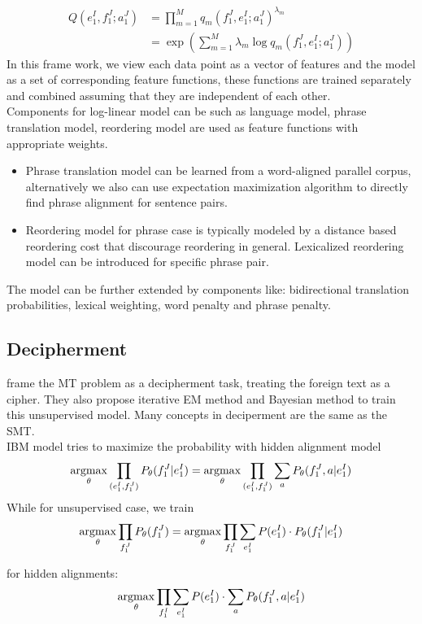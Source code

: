\begin{align*}
	Q(e_1^I, f_1^J; a_1^J) & = \prod_{m=1}^{M} q_m(f_1^J, e_1^I; a_1^J)^{\lambda_m} \\
	& = \exp(\sum_{m=1}^{M} \lambda_m \log q_m(f_1^J, e_1^I; a_1^J))
\end{align*}
In this frame work, we view each data point as a vector of features and the model as a set of corresponding feature functions, these functions are trained separately and combined assuming that they are independent of each other.\\ 

Components for log-linear model can be such as language model, phrase translation model, reordering model are used as feature functions with appropriate weights.
\begin{itemize}
	\item Phrase translation model can be learned from a word-aligned parallel corpus, alternatively we also can use expectation maximization algorithm to directly find phrase alignment for sentence pairs.
	\item Reordering model for phrase case is typically modeled by a distance based reordering cost that discourage reordering in general. Lexicalized reordering model can be introduced for specific phrase pair.
\end{itemize}

The model can be further extended by components like: bidirectional translation probabilities, lexical weighting, word penalty and phrase penalty. 

\subsection{Decipherment}
\cite{ravi2011deciphering} frame the MT problem as a decipherment task, treating the foreign text as a cipher. They also propose iterative EM method and Bayesian method to train this unsupervised model. Many concepts in deciperment are the same as the SMT.\\

IBM model tries to maximize the probability with hidden alignment model
\[ \underset{\theta}{\operatorname{argmax}} \prod_{(e_1^I,{f}_1^J) } {P_{\theta}(f_1^J|e_1^I)} = \underset{\theta}{\operatorname{argmax}} \prod_{ (e_1^I,{f}_1^J) } \sum_{a} P_{\theta}({f}_1^J, a| e_1^I)  \]
While for unsupervised case, we train 
\[ \underset{\theta}{\operatorname{argmax}} \prod_{f_1^J}P_{\theta}(f_1^J)= \underset{\theta}{\operatorname{argmax}} \prod_{f_1^J} \sum_{e_1^I} P({e}_1^I) \cdot P_{\theta}(f_1^J|e_1^I)\]

for hidden alignments: \[ \underset{\theta}{\operatorname{argmax}} \prod_{{f}_1^I} \sum_{{e}_1^I} P({e}_1^I) \cdot \sum_{a} P_{\theta}({f}_1^J,a|{e}_1^I) \]

